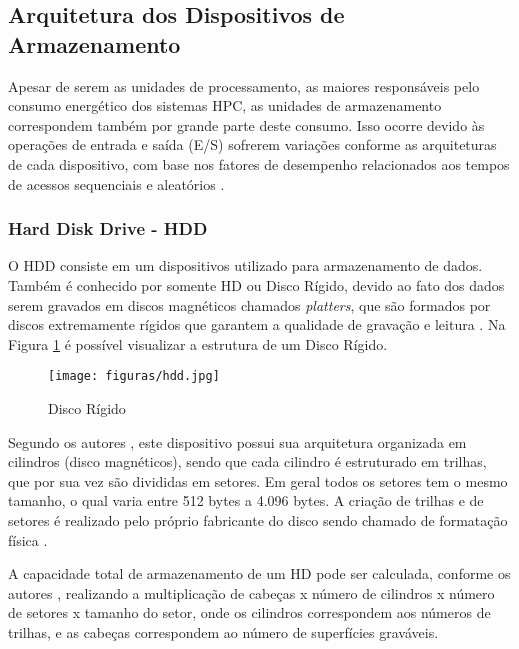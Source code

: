 \subsection{Arquitetura dos Dispositivos de Armazenamento}

Apesar de serem as unidades de processamento, as maiores responsáveis pelo consumo energético dos sistemas HPC, as unidades de armazenamento correspondem também por grande parte deste consumo. Isso ocorre devido às operações de entrada e saída (E/S) sofrerem variações conforme as arquiteturas de cada dispositivo, com base nos fatores de desempenho relacionados aos tempos de acessos sequenciais e aleatórios \cite{welch2013optimizing}.

\subsubsection{Hard Disk Drive - HDD}

O HDD consiste em um dispositivos utilizado para armazenamento de dados. Também é conhecido por somente HD ou Disco Rígido, devido ao fato dos dados serem gravados em discos magnéticos chamados \textit{platters}, que são formados por discos extremamente rígidos que garantem a qualidade de gravação e leitura . Na Figura \ref{fig:hdd} é possível visualizar a estrutura de um Disco Rígido.

\begin{figure}[htb]
	\caption{\label{fig:hdd}Disco Rígido}
	\begin{center}
	    \texttt{[image: figuras/hdd.jpg]}
	\end{center}
\end{figure}

Segundo os autores \cite{tanenbaum2009sistemas}, este dispositivo possui sua arquitetura organizada em cilindros (disco magnéticos), sendo que cada cilindro é estruturado em trilhas, que por sua vez são divididas em setores. Em geral todos os setores tem o mesmo tamanho, o qual varia entre 512 bytes a 4.096 bytes. A criação de trilhas e de setores é realizado pelo próprio fabricante do disco sendo chamado de formatação física \cite[Pg. 137]{oliveira2009sistemas}.

A capacidade total de armazenamento de um HD pode ser calculada, conforme os autores \cite{oliveira2009sistemas}, realizando a multiplicação de cabeças x número de cilindros x número de setores x tamanho do setor, onde os cilindros correspondem aos números de trilhas, e as cabeças correspondem ao número de superfícies graváveis.

